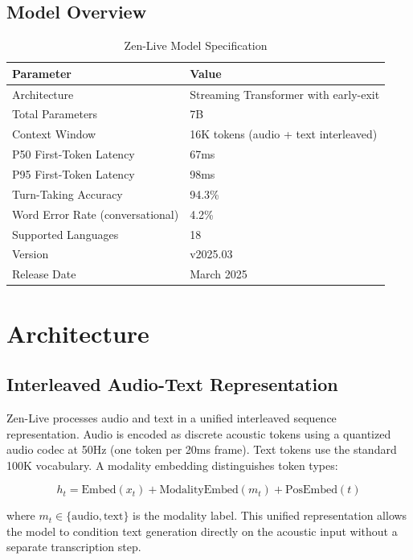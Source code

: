 \documentclass[11pt,a4paper]{article}
\begin{document}
\subsection{Model Overview}

\begin{table}[H]
\centering
\caption{Zen-Live Model Specification}
\begin{tabular}{ll}
\toprule
\textbf{Parameter} & \textbf{Value} \\
\midrule
Architecture & Streaming Transformer with early-exit \\
Total Parameters & 7B \\
Context Window & 16K tokens (audio + text interleaved) \\
P50 First-Token Latency & 67ms \\
P95 First-Token Latency & 98ms \\
Turn-Taking Accuracy & 94.3\% \\
Word Error Rate (conversational) & 4.2\% \\
Supported Languages & 18 \\
Version & v2025.03 \\
Release Date & March 2025 \\
\bottomrule
\end{tabular}
\end{table}

\section{Architecture}

\subsection{Interleaved Audio-Text Representation}

Zen-Live processes audio and text in a unified interleaved sequence representation. Audio is encoded as discrete acoustic tokens using a quantized audio codec at 50Hz (one token per 20ms frame). Text tokens use the standard 100K vocabulary. A modality embedding distinguishes token types:

\begin{equation}
  h_t = \text{Embed}(x_t) + \text{ModalityEmbed}(m_t) + \text{PosEmbed}(t)
\end{equation}

where $m_t \in \{\text{audio}, \text{text}\}$ is the modality label. This unified representation allows the model to condition text generation directly on the acoustic input without a separate transcription step.
\end{document}
